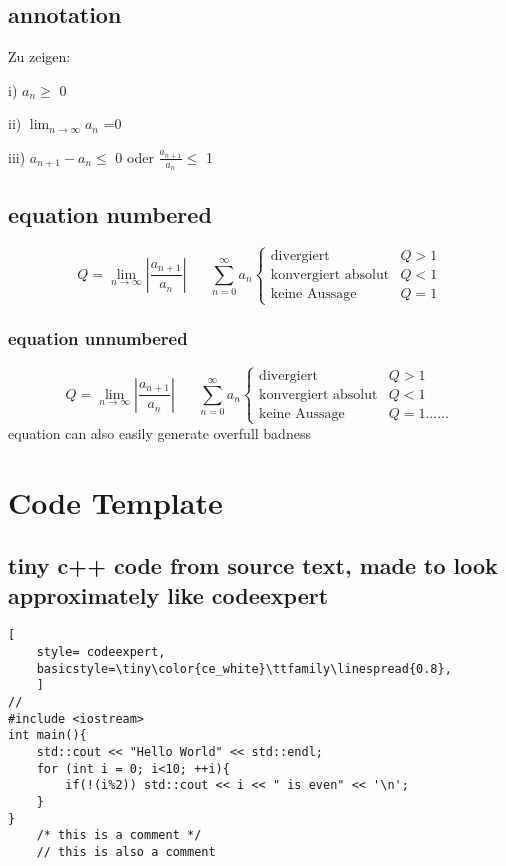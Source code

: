 \documentclass[a4paper,10pt,landscape]{scrartcl}
\begin{document}
\begin{multicols*}{3}
\subsection{annotation}
\begin{annotation}{Zu zeigen:}
	\item[i)] $a_n \ge$ 0
	\item[ii)] $\lim_{n\rightarrow \infty} a_n$ =0
	\item[iii)] $a_{n+1} - a_n \le$ 0 oder $\frac{a_{n+1}}{a_n} \le $ 1
\end{annotation}
%
\subsection{equation numbered}
\begin{equation}
Q=\lim_{n\rightarrow \infty} \left \vert\frac{a_{n+1}}{a_n}\right \vert \hspace{20pt} \sum_{n=0}^{\infty}a_n
	\begin{cases}
		\text{divergiert} \hspace{5pt} &Q>1\\
		\text{konvergiert absolut} &Q<1\\
		\text{keine Aussage} &Q=1
	\end{cases}
\end{equation}
%
\subsubsection{equation unnumbered}
\begin{equation*}
Q=\lim_{n\rightarrow \infty} \left \vert\frac{a_{n+1}}{a_n}\right \vert \hspace{20pt} \sum_{n=0}^{\infty}a_n
	\begin{cases}
		\text{divergiert} \hspace{5pt} &Q>1\\
		\text{konvergiert absolut} &Q<1\\
		\text{keine Aussage} &Q=1......
	\end{cases}
\end{equation*}
equation can also easily generate overfull badness
%
\vfill\null %
\columnbreak
\section{Code Template }
\subsection{tiny c++ code from source text, made to look approximately like codeexpert}
\begin{lstlisting}[
    style= codeexpert,
    basicstyle=\tiny\color{ce_white}\ttfamily\linespread{0.8},
    ]
//
#include <iostream>
int main(){
    std::cout << "Hello World" << std::endl;
    for (int i = 0; i<10; ++i){
        if(!(i%2)) std::cout << i << " is even" << '\n';
    }
}
    /* this is a comment */
    // this is also a comment
\end{lstlisting}
%

\end{multicols*}
\end{document}
